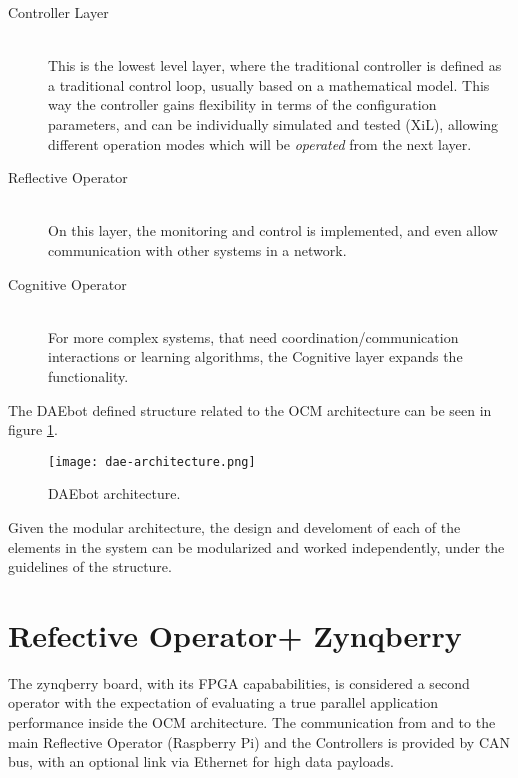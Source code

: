 \begin{description}
	\item[Controller Layer] \hfill \\ This is the lowest level layer, where the traditional controller is defined as a traditional control loop, usually based on a mathematical model. This way the controller gains flexibility in terms of the configuration parameters, and can be individually simulated and tested (XiL), allowing different operation modes which will be \textit{operated} from the next layer.
	\item[Reflective Operator] \hfill \\ On this layer, the monitoring and control is implemented, and even allow communication with other systems in a network.
	\item[Cognitive Operator] \hfill \\ For more complex systems, that need coordination/communication interactions or learning algorithms, the Cognitive layer expands the functionality.
\end{description}

The DAEbot defined structure related to the OCM architecture can be seen in figure \ref{fig:daebot}.

\begin{figure}[h]
	\centering
	\texttt{[image: dae-architecture.png]}
	\caption{DAEbot architecture.} \label{fig:daebot}
\end{figure}

Given the modular architecture, the design and develoment of each of the elements in the system can be modularized and worked independently, under the guidelines of the structure.

\section{Refective Operator+ Zynqberry}

The zynqberry board, with its FPGA capababilities, is considered a second operator with the expectation of evaluating a true parallel application performance inside the OCM architecture. The communication from and to the main Reflective Operator (Raspberry Pi) and the Controllers is provided by CAN bus, with an optional link via Ethernet for high data payloads.

